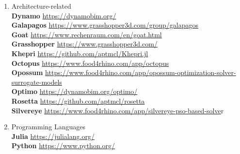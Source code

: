 \begin{enumerate}[label=\Alph*]
\item Architecture-related \\
\textbf{Dynamo} \url{https://dynamobim.org/} \\
\textbf{Galapagos} \url{https://www.grasshopper3d.com/group/galapagos} \\
\textbf{Goat} \url{https://www.rechenraum.com/en/goat.html} \\ 
\textbf{Grasshopper} \url{https://www.grasshopper3d.com/} \\ 
\textbf{Khepri} \url{https://github.com/aptmcl/Khepri.jl} \\
\textbf{Octopus} \url{https://www.food4rhino.com/app/octopus} \\
\textbf{Opossum}  \url{https://www.food4rhino.com/app/opossum-optimization-solver-surrogate-models} \\
\textbf{Optimo} \url{https://dynamobim.org/optimo/} \\
\textbf{Rosetta} \url{https://github.com/aptmcl/rosetta} \\
\textbf{Silvereye} \url{https://www.food4rhino.com/app/silvereye-pso-based-solve}r \\

\item Programming Languages \\
\textbf{Julia} \url{https://julialang.org/} \\
\textbf{Python} \url{https://www.python.org/}

\end{enumerate}